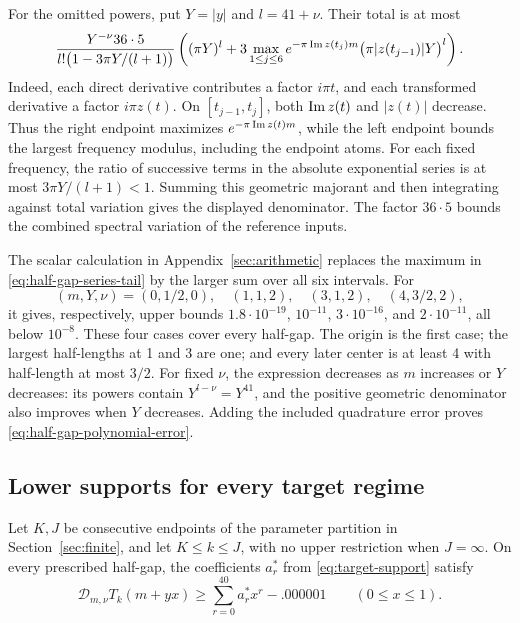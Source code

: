 For the omitted powers, put \(Y=|y|\) and \(l=41+\nu\).  Their total is at
most
\begin{equation}\label{eq:half-gap-series-tail}
 \frac{Y^{-\nu}36\cdot5}
 {l!\bigl(1-3\pi Y/(l+1)\bigr)}
 \left((\pi Y)^l+
 3\max_{1\le j\le6}
 e^{-\pi\operatorname{Im} z(t_j)m}
       \bigl(\pi|z(t_{j-1})|Y\bigr)^l\right).
\end{equation}
Indeed, each direct derivative contributes a factor \(i\pi t\), and each
transformed derivative a factor \(i\pi z(t)\).  On
\([t_{j-1},t_j]\), both \(\operatorname{Im} z(t)\) and \(|z(t)|\) decrease.  Thus the
right endpoint maximizes \(e^{-\pi\operatorname{Im} z(t)m}\), while the left endpoint
bounds the largest frequency modulus, including the endpoint atoms.  For each
fixed frequency, the ratio of successive terms in the absolute
exponential series is at most \(3\pi Y/(l+1)<1\).  Summing this geometric
majorant and then integrating against total variation gives the displayed
denominator.  The factor \(36\cdot5\) bounds the combined spectral
variation of the reference inputs.

The scalar calculation in Appendix~\ref{sec:arithmetic} replaces the maximum
in \eqref{eq:half-gap-series-tail} by the larger sum over all six intervals.
For
\[
 (m,Y,\nu)=(0,1/2,0),\quad(1,1,2),\quad(3,1,2),\quad(4,3/2,2),
\]
it gives, respectively, upper bounds \(1.8\cdot10^{-19}\), \(10^{-11}\),
\(3\cdot10^{-16}\), and \(2\cdot10^{-11}\), all below \(10^{-8}\).  These
four cases cover every half-gap.  The origin is the first case; the largest
half-lengths at 1 and 3 are one; and every later center is at least 4 with
half-length at most \(3/2\).  For fixed \(\nu\), the expression decreases as
\(m\) increases or \(Y\) decreases: its powers contain \(Y^{l-\nu}=Y^{41}\),
and the positive geometric denominator also improves when \(Y\) decreases.
Adding the included quadrature error proves
\eqref{eq:half-gap-polynomial-error}.

\subsection{Lower supports for every target regime}

\begin{lemma}\label{lem:exponential-support}
Let \(K,J\) be consecutive endpoints of the parameter partition in
Section~\ref{sec:finite}, and let \(K\le k\le J\), with no upper restriction
when \(J=\infty\).  On every prescribed half-gap, the coefficients \(a_r^*\)
from \eqref{eq:target-support} satisfy
\[
 \mathcal D_{m,\nu}T_k(m+yx)
 \ge\sum_{r=0}^{40}a_r^*x^r-.000001\qquad(0\le x\le1).
\]
\end{lemma}

